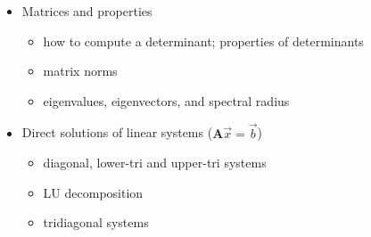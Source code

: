 \documentclass[12pt]{article}
\newcommand{\ve}[1]{\ensuremath{\mathbf{#1}}}
\begin{document}
\begin{itemize}
\item Matrices and properties
  \begin{itemize}
  \item how to compute a determinant; properties of determinants
  \item matrix norms
  \item eigenvalues, eigenvectors, and spectral radius
  \end{itemize}

\item Direct solutions of linear systems ($\ve{A}\vec{x} = \vec{b}$)
  \begin{itemize}
  \item diagonal, lower-tri and upper-tri systems
  \item LU decomposition
  \item tridiagonal systems
  \end{itemize}
\end{itemize}
\end{document}
